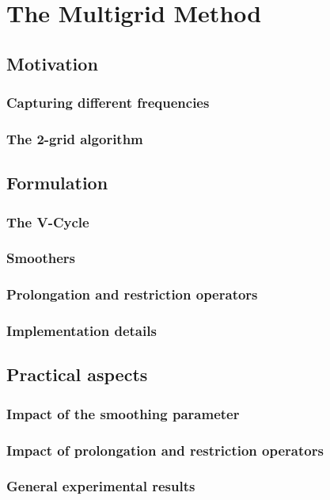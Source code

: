 \chapter{The Multigrid Method}

\section{Motivation}
	\subsection{Capturing different frequencies}
	\subsection{The 2-grid algorithm}
	
\section{Formulation}
	\subsection{The V-Cycle}
	\subsection{Smoothers}
	\subsection{Prolongation and restriction operators}
	\subsection{Implementation details}
	
\section{Practical aspects}
	\subsection{Impact of the smoothing parameter}
	\subsection{Impact of prolongation and restriction operators}
	\subsection{General experimental results}
	
